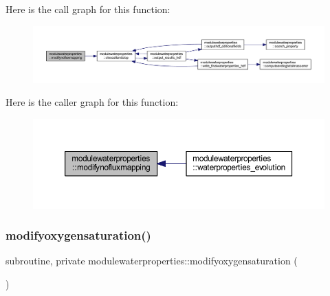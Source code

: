 Here is the call graph for this function\+:\nopagebreak
\begin{figure}[H]
\begin{center}
\leavevmode
\includegraphics[width=350pt]{namespacemodulewaterproperties_a3d30e149ea4b3528ce74dea8162b347f_cgraph}
\end{center}
\end{figure}
Here is the caller graph for this function\+:\nopagebreak
\begin{figure}[H]
\begin{center}
\leavevmode
\includegraphics[width=350pt]{namespacemodulewaterproperties_a3d30e149ea4b3528ce74dea8162b347f_icgraph}
\end{center}
\end{figure}
\mbox{\label{namespacemodulewaterproperties_a44ca5a1d937416e29607a7effa0209d5}} 
\subsubsection{\texorpdfstring{modifyoxygensaturation()}{modifyoxygensaturation()}}
{\footnotesize\ttfamily subroutine, private modulewaterproperties\+::modifyoxygensaturation (\begin{DoxyParamCaption}{ }\end{DoxyParamCaption})\hspace{0.3cm}{\ttfamily [private]}}


